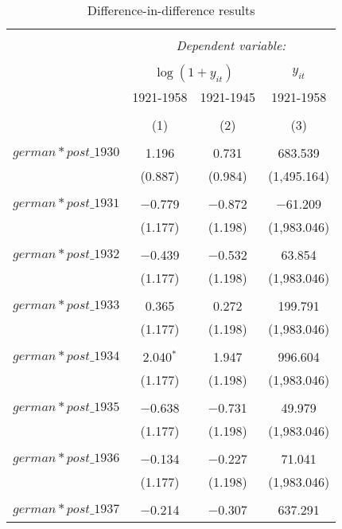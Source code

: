
\begin{table}[!htbp] \centering 
  \caption{Difference-in-difference results} 
  \label{dif_table} 
\begin{tabular}{@{\extracolsep{5pt}}lccc} 
\\[-1.8ex]\hline 
\hline \\[-1.8ex] 
 & \multicolumn{3}{c}{\textit{Dependent variable:}} \\ 
\cline{2-4} 
\\[-1.8ex] & \multicolumn{2}{c}{$\log(1 + y_{it})$} & $y_{it}$ \\ 
 & 1921-1958 & 1921-1945 & 1921-1958 \\ 
\\[-1.8ex] & (1) & (2) & (3)\\ 
\hline \\[-1.8ex] 
 $german*post\_1930$ & 1.196 & 0.731 & 683.539 \\ 
  & (0.887) & (0.984) & (1,495.164) \\ 
  & & & \\ 
 $german*post\_1931$ & $-$0.779 & $-$0.872 & $-$61.209 \\ 
  & (1.177) & (1.198) & (1,983.046) \\ 
  & & & \\ 
 $german*post\_1932$ & $-$0.439 & $-$0.532 & 63.854 \\ 
  & (1.177) & (1.198) & (1,983.046) \\ 
  & & & \\ 
 $german*post\_1933$ & 0.365 & 0.272 & 199.791 \\ 
  & (1.177) & (1.198) & (1,983.046) \\ 
  & & & \\ 
 $german*post\_1934$ & 2.040$^{*}$ & 1.947 & 996.604 \\ 
  & (1.177) & (1.198) & (1,983.046) \\ 
  & & & \\ 
 $german*post\_1935$ & $-$0.638 & $-$0.731 & 49.979 \\ 
  & (1.177) & (1.198) & (1,983.046) \\ 
  & & & \\ 
 $german*post\_1936$ & $-$0.134 & $-$0.227 & 71.041 \\ 
  & (1.177) & (1.198) & (1,983.046) \\ 
  & & & \\ 
 $german*post\_1937$ & $-$0.214 & $-$0.307 & 637.291 \\ 

\end{tabular}
\end{table}
